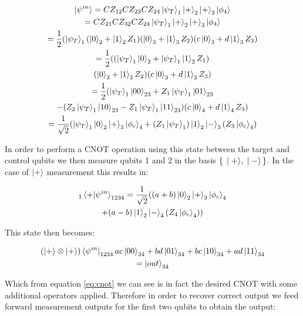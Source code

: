 \begin{multline}
\ket{\psi^{in}} = CZ_{12} CZ_{23} CZ_{24} \ket{\psi_{T}}_{1} \ket{+}_{2} \ket{+}_{3} \ket{\phi_{4}} \\
= CZ_{21} CZ_{32} CZ_{24} \ket{\psi_{T}}_{1} \ket{+}_{2} \ket{+}_{3} \ket{\phi_{4}} \\
= \frac{1}{2} (\ket{\psi_{T}}_{1} (\ket{0}_{2} + \ket{1}_{2} Z_{1}) (\ket{0}_{3} + \ket{1}_{3} Z_{2}) (c \ket{0}_{3} + d \ket{1}_{3} Z_{3}) \\
= \frac{1}{2} ((\ket{\psi_{T}}_{1} \ket{0}_{2} + \ket{\psi_{T}}_{1} \ket{1}_{2} Z_{1}) \\ (\ket{0}_{3} + \ket{1}_{3} Z_{2}) (c \ket{0}_{3} + d \ket{1}_{3} Z_{3}) \\
= \frac{1}{2} (\ket{\psi_{T}}_{1} \ket{00}_{23} + Z_{1} \ket{\psi_{T}}_{1} \ket{01}_{23} \\
- (Z_{2} \ket{\psi_{T}}_{1} \ket{10}_{23} - Z_{1} \ket{\psi_{T}}_{1} \ket{11}_{23})(c \ket{0}_{4} + d \ket{1}_{4} Z_{3}) \\
= \frac{1}{\sqrt{2}}(\ket{\psi_{T}}_{1} \ket{0}_{2} \ket{+}_{3} \ket{\phi_{c}}_{4}+ (Z_{1} \ket{\psi_{T}}_{1}) \ket{1}_{2} \ket{-}_{3} (Z_{3} \ket{\phi_{c}}_{4}) \\
\end{multline}

In order to perform a CNOT operation using this state between the target and control qubits we then measure qubits 1 and 2 in the basis $\set{\ket{+}, \ket{-}}$. In the case of $\ket{+}$ measurement this results in:

\begin{multline}
_{1} \braket{+ | \psi^{in}}_{1234} = \frac{1}{\sqrt{2}} ((a + b) \ket{0}_{2} \ket{+}_{3} \ket{\phi_{c}}_{4} \\
 + (a-b) \ket{1}_{2} \ket{-}_{4} (Z_{4} \ket{\phi_{c}}_{4}))
\end{multline}

This state then becomes:

\begin{multline}
(\ket{+} \otimes \ket{+}) \bra{\psi^{in}}_{1234} ac \ket{00}_{34} + bd \ket{01}_{34} + bc \ket{10}_{34} + ad \ket{11}_{34} \\
= \ket{out}_{34}
\end{multline}

Which from equation \eqref{eq:cnot} we can see is in fact the desired CNOT with some additional operators applied. Therefore in order to recover correct output we feed forward measurement outputs for the first two qubits to obtain the output:

